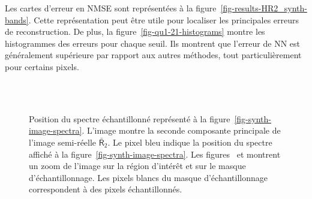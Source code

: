 Les cartes d'erreur en NMSE sont représentées à la figure~\ref{fig-results-HR2_synth-bands}. Cette représentation peut être utile pour localiser les principales erreurs de reconstruction. De plus, la figure~\ref{fig-qu1-21-histograms} montre les histogrammes des erreurs pour chaque seuil. Ils montrent que l'erreur de NN est généralement supérieure par rapport aux autres méthodes, tout particulièrement pour certains pixels.

\begin{figure}[htbp]
    \centering
    \\
    \hskip 20pt
    \\
    \caption{Position du spectre échantillonné représenté à la figure~\protect\ref{fig-synth-image-spectra}.
        L'image  montre la seconde composante principale de l'image semi-réelle $\bar{\mathsf{R}}_2$. Le pixel bleu indique la position du spectre affiché à la figure~\protect\ref{fig-synth-image-spectra}. Les figures~\protect{} et  \protect{} montrent un zoom de l'image sur la région d'intérêt et sur le masque d'échantillonnage. Les pixels blancs du masque d'échantillonnage correspondent à des pixels échantillonnés.
        \protect\label{fig-synth-image-spectra-locations}}
\end{figure}


